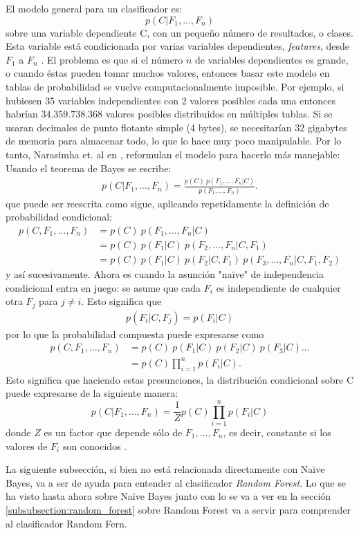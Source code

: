 	El modelo general para un clasificador es:
		$$p(C \vert F_1,\dots,F_n)$$
	sobre una variable dependiente C, con un pequeño número de resultados, o clases. Esta variable está condicionada por varias variables dependientes, \textit{features}, desde $F_1$ a $F_n$ \cite{NarasMurty}. El problema es que si el número $n$ de variables dependientes es grande, o cuando éstas pueden tomar muchos valores, entonces basar este modelo en tablas de probabilidad se vuelve computacionalmente imposible. Por ejemplo, si hubiesen $35$ variables independientes con $2$ valores posibles cada una entonces habrían $34.359.738.368$ valores posibles distribuidos en múltiples tablas. Si se usaran decimales de punto flotante simple (4 bytes), se necesitarían 32 gigabytes de memoria para almacenar todo, lo que lo hace muy poco manipulable. Por lo tanto, Narasimha et. al en \cite{NarasMurty}, reformulan el modelo para hacerlo más manejable:
Usando el teorema de Bayes se escribe:
		\begin{align*}
		p(C \vert F_1,\dots,F_n) = \frac{p(C) \ p(F_1,\dots,F_n\vert C)}{p(F_1,\dots,F_n)}.
		\end{align*}
		que puede ser reescrita como sigue, aplicando repetidamente la definición de probabilidad condicional:
		\begin{align}
		p(C, F_1, \dots, F_n)
		&= p(C) \ p(F_1,\dots,F_n\vert C) \\
		&= p(C) \ p(F_1\vert C) \ p(F_2,\dots,F_n\vert C, F_1) \\
		&= p(C) \ p(F_1\vert C) \ p(F_2\vert C, F_1) \ p(F_3,\dots,F_n\vert C, F_1, F_2)
		\end{align}
		y así sucesivamente. Ahora es cuando la asunción "na\"{i}ve" de independencia condicional entra en juego: se asume que cada $F_i$ es independiente de cualquier otra $F_j$ para $j \neq i$. Esto significa que
		\begin{align*}
		p(F_i \vert C, F_j) = p(F_i \vert C)
		\end{align*}
		por lo que la probabilidad compuesta puede expresarse como
		\begin{align*}
		p(C, F_1, \dots, F_n) 
		&= p(C) \ p(F_1\vert C) \ p(F_2\vert C) \ p(F_3\vert C) \dots \\
		&= p(C) \prod_{i=1}^n p(F_i \vert C).
		\end{align*}
		Esto significa que haciendo estas presunciones, la distribución condicional sobre C puede expresarse de la siguiente manera:
		$$p(C \vert F_1,\dots,F_n) = \frac{1}{Z}p(C)\prod_{i=1}^n p(F_i \vert C)$$
		donde $Z$ es un factor que depende sólo de $F_1,\dots , F_n$, es decir, constante si los valores de $F_i$ son conocidos \cite{NarasMurty}.
		
		La siguiente subsección, si bien no está relacionada directamente con Na\"{i}ve Bayes, va a ser de ayuda para entender al clasificador \textit{Random Forest}. Lo que se ha visto hasta ahora sobre Na\"{i}ve Bayes junto con lo se va a ver en la sección \ref{subsubsection:random_forest} sobre Random Forest va a servir para comprender al clasificador Random Fern.
		